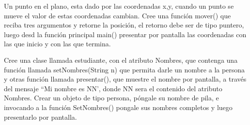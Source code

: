 \documentclass[12pt,answers]{exam}
\begin{document}
\begin{questions}
\question[25] Un punto en el plano, esta dado por las coordenadas x,y, cuando un punto se mueve el valor de estas coordenadas cambian. Cree una función mover() que reciba tres argumentos y retorne la posición, el retorno debe ser de tipo puntero, luego desd la función principal main() presentar por pantalla las coordenadas con las que inicio y con las que termina.

   



\question[25] Cree una clase llamada estudiante, con el atributo Nombres, que contenga una función llamada setNombres(String n) que permita darle un nombre a la persona y otras función llamada presentar(), que muestre el nombre por pantalla, a través del mensaje ``Mi nombre es NN', donde NN sera el contenido del atributo Nombres.
  Crear un objeto de tipo persona, póngale su nombre de pila, e invocando a la función SetNombres() pongale sus nombres completos y luego presentarlo por pantalla.
 
 


  
\end{questions}

\newpage
  


  
\end{document}
